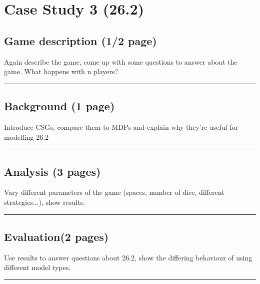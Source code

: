 \chapter{Case Study 3 (26.2)}

\section{Game description (1/2 page)}

Again describe the game, come up with some questions to answer about the game. What happens with n players?

\hrule

\blindtext

\blindtext

\blindtext

\section{Background (1 page)}

Introduce CSGs, compare them to MDPs and explain why they're useful for modelling 26.2

\hrule

\Blindtext

\section{Analysis (3 pages)}

Vary different parameters of the game (spaces, number of dice, different strategies...), show results.

\hrule

\Blindtext

\Blindtext

\Blindtext

\section{Evaluation(2 pages)}

Use results to answer questions about 26.2, show the differing behaviour of using different model types.

\hrule

\Blindtext

\Blindtext